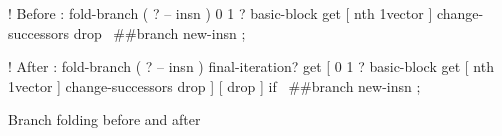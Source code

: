\centering

  \begin{factorcode}
    ! Before
    : fold-branch ( ? -- insn )
        0 1 ?
        basic-block get [ nth 1vector ] change-successors drop
        \ ##branch new-insn ;

    ! After
    : fold-branch ( ? -- insn )
        final-iteration? get [
            0 1 ?
            basic-block get [ nth 1vector ] change-successors drop
        ] [ drop ] if
        \ ##branch new-insn ;
  \end{factorcode}

\caption{Branch folding before and after}

